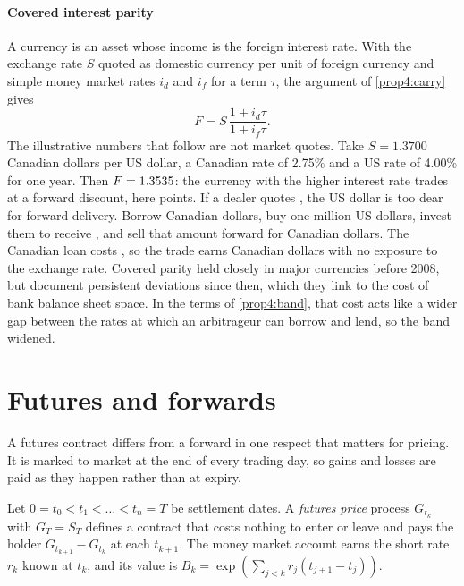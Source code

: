 \begin{chapterrefs}
\paragraph{Covered interest parity} A currency is an asset whose income is the foreign interest rate.
With the exchange rate $S$ quoted as domestic currency per unit of foreign currency and simple money
market rates $i_d$ and $i_f$ for a term $\tau$, the argument of \cref{prop4:carry} gives
\begin{equation}\label{eq4:cip}
  F=S\,\frac{1+i_d\tau}{1+i_f\tau}.
\end{equation}
The illustrative numbers that follow are not market quotes. Take $S=1.3700$ Canadian dollars per US
dollar, a Canadian rate of 2.75\% and a US rate of 4.00\% for one year. Then $F=1.3535$: the currency
with the higher interest rate trades at a forward discount, here \cipPoints{} points. If a dealer quotes
\cipQuote, the US dollar is too dear for forward delivery. Borrow \cipBorrow{} Canadian dollars, buy
one million US dollars, invest them to receive \cipUSDEnd, and sell that amount forward for
\cipReceive{} Canadian dollars. The Canadian loan costs \cipOweCAD, so the trade earns \cipProfit{}
Canadian dollars with no exposure to the exchange rate. Covered parity held closely in major currencies
before 2008, but \textcite{du2018} document persistent deviations since then, which they link to the
cost of bank balance sheet space. In the terms of \cref{prop4:band}, that cost acts like a wider gap
between the rates at which an arbitrageur can borrow and lend, so the band widened.

\section{Futures and forwards}
\label{sec4:fut}

A futures contract differs from a forward in one respect that matters for pricing. It is marked to
market at the end of every trading day, so gains and losses are paid as they happen rather than at
expiry.

\begin{definition}\label{def4:futures}
Let $0=t_0<t_1<\dots<t_n=T$ be settlement dates. A \emph{futures price} process $G_{t_k}$ with
$G_T=S_T$ defines a contract that costs nothing to enter or leave and pays the holder
$G_{t_{k+1}}-G_{t_k}$ at each $t_{k+1}$. The money market account earns the short rate $r_k$ known at
$t_k$, and its value is $B_k=\exp(\sum_{j<k}r_j(t_{j+1}-t_j))$.
\end{definition}


\end{chapterrefs}
